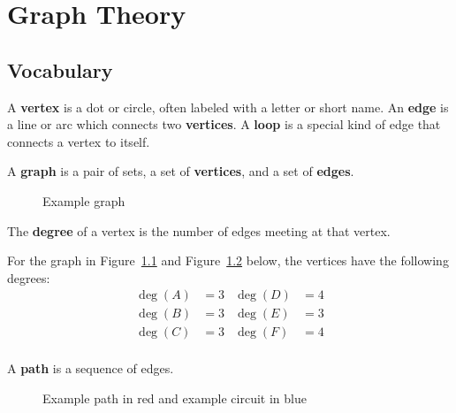 \chapter{Graph Theory}%
\label{chap:graph-theory}

\section{Vocabulary}%
\label{sec:vocabulary}

\begin{definition}
  A \textbf{vertex} is a dot or circle, often labeled with a letter
  or short name. An \textbf{edge} is a line or arc which connects two
  \textbf{vertices}. A \textbf{loop} is a special kind of edge that
  connects a vertex to itself.
\end{definition}

\begin{definition}
  A \textbf{graph} is a pair of sets, a set of \textbf{vertices}, and
  a set of \textbf{edges}.
\end{definition}

\begin{figure}[h!]
  \centering
  
  \caption{Example graph}%
  \label{fig:example-graph}
\end{figure}

\newpage

\begin{definition}
  The \textbf{degree} of a vertex is the number of edges meeting at
  that vertex.
\end{definition}

\begin{example}
  For the graph in Figure~\ref{fig:example-graph} and
  Figure~\ref{fig:example-path-circuit} below, the vertices have the
  following degrees:
  \begin{align*}
    \deg(A) &= 3 & \deg(D) &= 4 \\
    \deg(B) &= 3 & \deg(E) &= 3 \\
    \deg(C) &= 3 & \deg(F) &= 4 \\
  \end{align*}
\end{example}

\begin{definition}
  A \textbf{path} is a sequence of edges.
\end{definition}
\begin{figure}[h!]
  \centering
  
  \caption{Example path in red and example circuit in blue}%
  \label{fig:example-path-circuit}
\end{figure}

